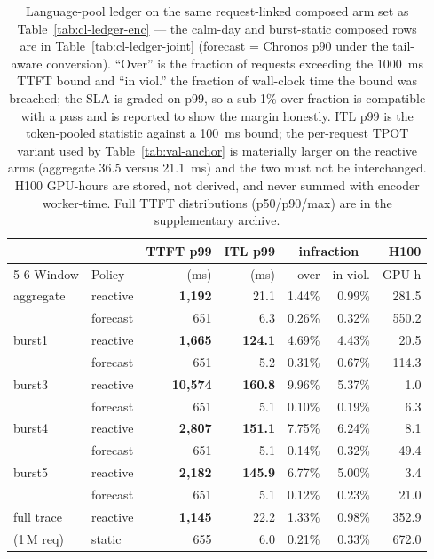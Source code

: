 \begin{table}[htbp]
\centering
\caption[Language-pool ledger, request-linked composed arm set]{Language-pool
ledger on the same request-linked composed arm set as
Table~\ref{tab:cl-ledger-enc}
--- the calm-day and burst-static composed rows are in
Table~\ref{tab:cl-ledger-joint} (forecast = Chronos p90 under the
tail-aware conversion). ``Over'' is the fraction of requests exceeding the
\SI{1000}{\milli\second} TTFT bound and ``in viol.'' the fraction of wall-clock
time the bound was breached; the SLA is graded on p99, so a sub-1\%
over-fraction is compatible with a pass and is reported to show the margin
honestly. ITL p99 is the token-pooled statistic against a
\SI{100}{\milli\second} bound; the per-request TPOT variant used by
Table~\ref{tab:val-anchor} is materially larger on the reactive arms (aggregate
36.5 versus \SI{21.1}{\milli\second}) and the two must not be interchanged.
H100 GPU-hours are stored, not derived, and never summed with encoder
worker-time. Full TTFT distributions (p50/p90/max) are in the supplementary
archive.}
\label{tab:cl-ledger-llm}
\footnotesize
\setlength{\tabcolsep}{4pt}
\begin{tabular}{@{}llrrrrr@{}}
\toprule
& & TTFT p99 & ITL p99 & \multicolumn{2}{c}{infraction} & H100 \\
\cmidrule(lr){5-6}
Window & Policy & (\si{\milli\second}) & (\si{\milli\second}) & over & in viol. & GPU-h \\
\midrule
aggregate & reactive & \textbf{1{,}192} & 21.1 & 1.44\% & 0.99\% & 281.5 \\
          & forecast & 651 & 6.3 & 0.26\% & 0.32\% & 550.2 \\
burst1 & reactive & \textbf{1{,}665} & \textbf{124.1} & 4.69\% & 4.43\% & 20.5 \\
       & forecast & 651 & 5.2 & 0.31\% & 0.67\% & 114.3 \\
burst3 & reactive & \textbf{10{,}574} & \textbf{160.8} & 9.96\% & 5.37\% & 1.0 \\
       & forecast & 651 & 5.1 & 0.10\% & 0.19\% & 6.3 \\
burst4 & reactive & \textbf{2{,}807} & \textbf{151.1} & 7.75\% & 6.24\% & 8.1 \\
       & forecast & 651 & 5.1 & 0.14\% & 0.32\% & 49.4 \\
burst5 & reactive & \textbf{2{,}182} & \textbf{145.9} & 6.77\% & 5.00\% & 3.4 \\
       & forecast & 651 & 5.1 & 0.12\% & 0.23\% & 21.0 \\
\midrule
full trace & reactive & \textbf{1{,}145} & 22.2 & 1.33\% & 0.98\% & 352.9 \\
(1\,M req) & static & 655 & 6.0 & 0.21\% & 0.33\% & 672.0 \\
\bottomrule
\end{tabular}


\end{table}
